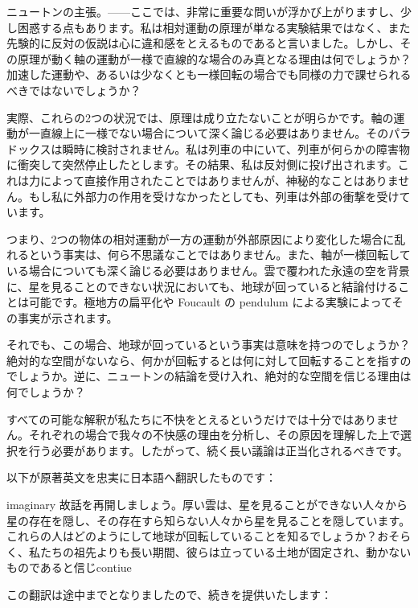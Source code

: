 \documentclass[a4paper,11pt,openany]{ltjsbook}
\begin{document}
ニュートンの主張。——ここでは、非常に重要な問いが浮かび上がりますし、少し困惑する点もあります。私は相対運動の原理が単なる実験結果ではなく、また先験的に反対の仮説は心に違和感をとえるものであると言いました。しかし、その原理が動く軸の運動が一様で直線的な場合のみ真となる理由は何でしょうか？加速した運動や、あるいは少なくとも一様回転の場合でも同様の力で課せられるべきではないでしょうか？

実際、これらの2つの状況では、原理は成り立たないことが明らかです。軸の運動が一直線上に一様でない場合について深く論じる必要はありません。そのパラドックスは瞬時に検討されません。私は列車の中にいて、列車が何らかの障害物に衝突して突然停止したとします。その結果、私は反対側に投げ出されます。これは力によって直接作用されたことではありませんが、神秘的なことはありません。もし私に外部力の作用を受けなかったとしても、列車は外部の衝撃を受けています。

つまり、2つの物体の相対運動が一方の運動が外部原因により変化した場合に乱れるという事実は、何ら不思議なことではありません。また、軸が一様回転している場合についても深く論じる必要はありません。雲で覆われた永遠の空を背景に、星を見ることのできない状況においても、地球が回っていると結論付けることは可能です。極地方の扁平化や Foucault の pendulum による実験によってその事実が示されます。

それでも、この場合、地球が回っているという事実は意味を持つのでしょうか？絶対的な空間がないなら、何かが回転するとは何に対して回転することを指すのでしょうか。逆に、ニュートンの結論を受け入れ、絶対的な空間を信じる理由は何でしょうか？

すべての可能な解釈が私たちに不快をとえるというだけでは十分ではありません。それぞれの場合で我々の不快感の理由を分析し、その原因を理解した上で選択を行う必要があります。したがって、続く長い議論は正当化されるべきです。

以下が原著英文を忠実に日本語へ翻訳したものです：

imaginary 故話を再開しましょう。厚い雲は、星を見ることができない人々から星の存在を隠し、その存在すら知らない人々から星を見ることを隠しています。これらの人はどのようにして地球が回転していることを知るでしょうか？おそらく、私たちの祖先よりも長い期間、彼らは立っている土地が固定され、動かないものであると信じcontiue

この翻訳は途中までとなりましたので、続きを提供いたします：
\end{document}
